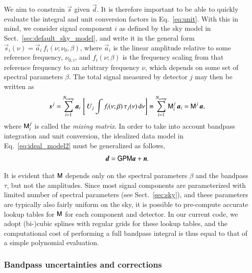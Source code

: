 \documentclass[twocolumn]{aa}
\renewcommand{\d}[0]{\vec{d}}
\newcommand{\n}[0]{\vec{n}}
\newcommand{\s}[0]{\vec{s}}
\renewcommand{\a}[0]{\vec{a}}
\newcommand{\M}[0]{\tens{M}}
\renewcommand{\P}[0]{\tens{P}}
\renewcommand{\G}[0]{\tens{G}}
\begin{document}
We aim to constrain $\s$ given $\d$. It is
therefore important to be able to quickly evaluate the integral and
unit conversion factors in Eq.~\eqref{eq:unit}. With this in mind, we
consider signal component $i$ as defined by the sky model in
Sect.~\ref{sec:default_sky_model}, and write it in the general form
$\s_i(\nu) = \a_i\,f_i(\nu; \nu_0, \beta)$, where $\a_i$ is the linear
amplitude relative to some reference frequency, $\nu_{0,i}$, and
$f_i(\nu; \beta)$ is the frequency scaling from that reference
frequency to an arbitrary frequency $\nu$, which depends on some set
of spectral parameters $\beta$. The total signal measured by detector
$j$ may then be written as
\begin{equation}
  \s^j = \sum_{i=1}^{N_{\mathrm{comp}}}\a_i\, \left[\,U_j \int f_i(\nu; \beta)\,
    \tau_j(\nu)\,\mathrm d\nu\right] \equiv
  \sum_{i=1}^{N_{\mathrm{comp}}}\M^j_i\,\a_i = \M^j\,\a,
  \label{eq:mixmat}
\end{equation}
where $\M^j_i$ is called the \emph{mixing matrix}. In order to take
into account bandpass integration and unit conversion, the idealized data
model in Eq.~\eqref{eq:ideal_model2} must be generalized as
follows,
\begin{equation}
  \d = \G\P\M\a + \n.
  \label{eq:ideal_model_bp}
\end{equation}

It is evident that $\M$ depends only on the spectral parameters
$\beta$ and the bandpass $\tau$, but not the amplitudes. Since most
signal components are parameterized with limited number of spectral
parameters (see Sect.~\ref{sec:sky}), and these parameters are
typically also fairly uniform on the sky, it is possible to pre-compute
accurate lookup tables for $\M$ for each component and detector. In
our current code, we adopt (bi-)cubic splines with regular grids for
these lookup tables, and the computational cost of performing a full
bandpass integral is thus equal to that of a simple polynomial
evaluation.



\subsubsection{Bandpass uncertainties and corrections}
\end{document}
